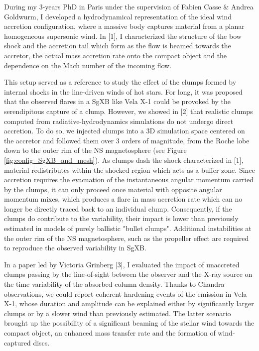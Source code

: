 \documentclass[letterpaper,12pt,onecolumn]{article}
\makeatletter
\newcommand{\sgx}{SgXB\xspace}
\newcommand*{\ns}{NS\@\xspace}
\makeatother
\begin{document}
During my 3-years PhD in Paris under the supervision of Fabien Casse \& Andrea Goldwurm, I developed a hydrodynamical representation of the ideal wind accretion configuration, where a massive body captures material from a planar homogeneous supersonic wind. In [1], I characterized the structure of the bow shock and the accretion tail which form as the flow is beamed towards the accretor, the actual mass accretion rate onto the compact object and the dependence on the Mach number of the incoming flow. 

This setup served as a reference to study the effect of the clumps formed by internal shocks in the line-driven winds of hot stars. For long, it was proposed that the observed flares in a \sgx like Vela X-1 could be provoked by the serendipitous capture of a clump. However, we showed in [2] that realistic clumps computed from radiative-hydrodynamics simulations do not undergo direct accretion. To do so, we injected clumps into a 3D simulation space centered on the accretor and followed them over 3 orders of magnitude, from the Roche lobe down to the outer rim of the \ns magnetosphere (see Figure\,\,\ref{fig:config_SgXB_and_mesh}). As clumps dash the shock characterized in [1], material redistributes within the shocked region which acts as a buffer zone. Since accretion requires the evacuation of the instantaneous angular momentum carried by the clumps, it can only proceed once material with opposite angular momentum mixes, which produces a flare in mass accretion rate which can no longer be directly traced back to an individual clump. Consequently, if the clumps do contribute to the variability, their impact is lower than previously estimated in models of purely ballistic "bullet clumps". Additional instabilities at the outer rim of the \ns magnetosphere, such as the propeller effect are required to reproduce the observed variability in \sgx.

In a paper led by Victoria Grinberg [3], I evaluated the impact of unaccreted clumps passing by the line-of-sight between the observer and the X-ray source on the time variability of the absorbed column density. Thanks to Chandra observations, we could report coherent hardening events of the emission in Vela X-1, whose duration and amplitude can be explained either by significantly larger clumps or by a slower wind than previously estimated. The latter scenario brought up the possibility of a significant beaming of the stellar wind towards the compact object, an enhanced mass transfer rate and the formation of wind-captured discs.
\end{document}
